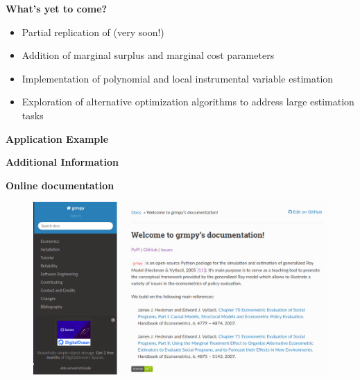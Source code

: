 \begin{frame}
	\textbf{What's yet to come?}
	\begin{itemize}
		\item Partial replication of  (very soon!)
		\item Addition of marginal surplus and marginal cost parameters
		\item Implementation of polynomial and local instrumental variable estimation
		\item Exploration of alternative optimization algorithms to address large estimation tasks
	\end{itemize}
\end{frame}

\begin{frame}\begin{center}
\LARGE\textbf{Application Example}
\end{center}\end{frame}


\begin{frame}\begin{center}
\LARGE\textbf{Additional Information}
\end{center}\end{frame}

\begin{frame}
\textbf{Online documentation}
\begin{figure}
  \includegraphics[scale=0.2]{../04_grmpy_tutorial_notebook/docu.png}
\end{figure}

\end{frame}
